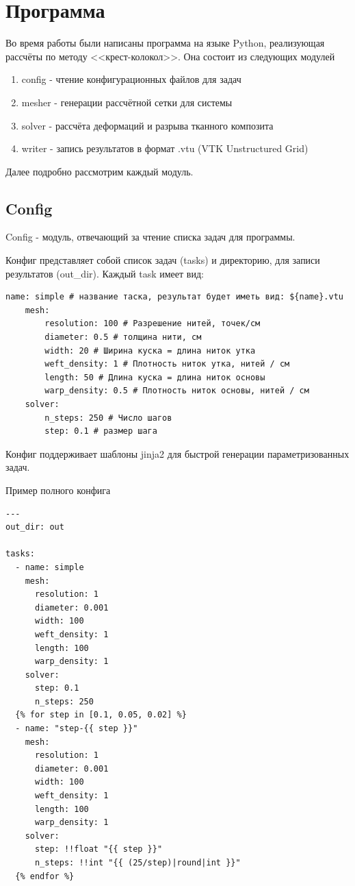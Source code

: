 \chapter{Программа}\label{ch:programm}

Во время работы были написаны программа на языке Python, реализующая рассчёты по методу <<крест-колокол>>.
Она состоит из следующих модулей
\begin{enumerate}
    \item config - чтение конфигурационных файлов для задач
    \item mesher - генерации рассчётной сетки для системы
    \item solver - рассчёта деформаций и разрыва тканного композита
    \item writer - запись результатов в формат .vtu (VTK Unstructured Grid)
\end{enumerate}
Далее подробно рассмотрим каждый модуль.

\section{Config}\label{sec:prog-config}
Config - модуль, отвечающий за чтение списка задач для программы.

Конфиг представляет собой список задач (tasks) и директорию, для записи результатов (out\_dir).
Каждый task имеет вид:
\begin{verbatim}
name: simple # название таска, результат будет иметь вид: ${name}.vtu
    mesh:
        resolution: 100 # Разрешение нитей, точек/см
        diameter: 0.5 # толщина нити, см
        width: 20 # Ширина куска = длина ниток утка
        weft_density: 1 # Плотность ниток утка, нитей / см
        length: 50 # Длина куска = длина ниток основы
        warp_density: 0.5 # Плотность ниток основы, нитей / см
    solver:
        n_steps: 250 # Число шагов
        step: 0.1 # размер шага
\end{verbatim}

Конфиг поддерживает шаблоны jinja2 для быстрой генерации параметризованных задач.

Пример полного конфига
\begin{verbatim}
---
out_dir: out

tasks:
  - name: simple
    mesh:
      resolution: 1
      diameter: 0.001
      width: 100
      weft_density: 1
      length: 100
      warp_density: 1
    solver:
      step: 0.1
      n_steps: 250
  {% for step in [0.1, 0.05, 0.02] %}
  - name: "step-{{ step }}"
    mesh:
      resolution: 1
      diameter: 0.001
      width: 100
      weft_density: 1
      length: 100
      warp_density: 1
    solver:
      step: !!float "{{ step }}"
      n_steps: !!int "{{ (25/step)|round|int }}"
  {% endfor %}
\end{verbatim}

